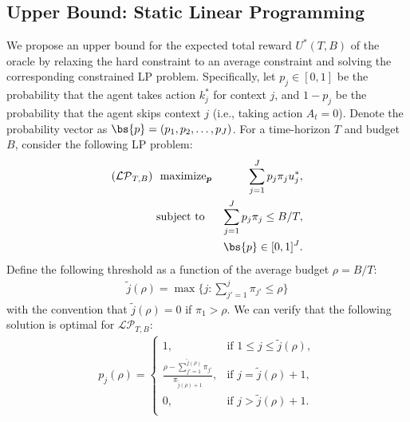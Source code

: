 \subsection{Upper Bound: Static Linear Programming}
We propose an upper bound for the expected total reward $U^*(T,B)$ of the oracle by relaxing the hard constraint to an average constraint
and solving the corresponding constrained LP problem. Specifically, let $p_j \in [0,1]$ be the probability that the agent takes action $k_j^*$ for context $j$,
and $1-p_j$ be the probability that the agent skips context $j$ (i.e., taking action $A_t = 0$).
Denote the probability vector as $\bs{p} = (p_1, p_2, \ldots, p_J)$. For a time-horizon $T$
and budget $B$, consider the following LP problem:
\vspace{-0.1cm}
\begin{eqnarray}
(\mathcal{LP}_{T,B})~~\text{maximize}_{\boldsymbol{p}} && \sum_{j = 1}^J p_j \pi_j u_j^*,  \label{eq:staticLP_obj} \\
\text{subject to~~} && \sum_{j=1}^J p_j \pi_j \leq B/T, \label{eq:staticLP_const}\\
&&\bs{p} \in [0,1]^J. \nonumber
\end{eqnarray}
Define the following threshold as a function of the average budget $\rho = B/T$:
\vspace{-0.1cm}
\begin{eqnarray} \label{eq:context_threhold}
\tilde{j}(\rho) = \max\{j: \sum_{j' = 1}^j\pi_{j'} \leq \rho\}
\end{eqnarray}
with the convention that $\tilde{j}(\rho) = 0$ if $\pi_1 > \rho$.
We can verify that the following solution is optimal for $\mathcal{LP}_{T,B}$:
\begin{eqnarray}\label{eq:LP_solution}
p_j(\rho) =
\begin{cases}
1, &\text{if $1 \leq j \leq  \tilde{j}(\rho)$},\\
\frac{\rho - \sum_{j' = 1}^{\tilde{j}(\rho)}\pi_{j'}}{\pi_{\tilde{j}(\rho)+1}}, & \text{if $j = \tilde{j}(\rho)+1$},\\
0, & \text{if $j > \tilde{j}(\rho)+1$}.\\
\end{cases}
\end{eqnarray}
